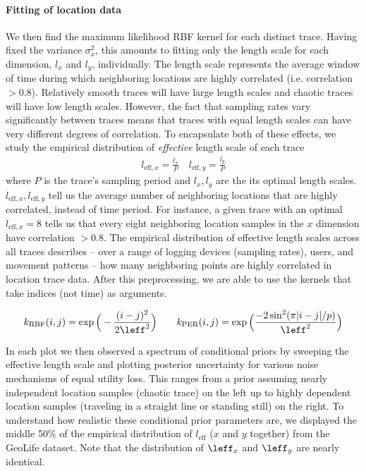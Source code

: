 \paragraph{Fitting of location data} We then find the maximum likelihood RBF kernel for each distinct trace. Having fixed the variance $\sigma_x^2$, this amounts to fitting only the length scale for each dimension, $l_x$ and $l_y$, individually. The length scale represents the average window of time during which neighboring locations are highly correlated (i.e. correlation $ > 0.8$). Relatively smooth traces will have large length scales and chaotic traces will have low length scales. However, the fact that sampling rates vary significantly between traces means that traces with equal length scales can have very different degrees of correlation. To encapsulate both of these effects, we study the empirical distribution of \emph{effective} length scale of each trace
\begin{align*}
	l_{\text{eff},x} = \frac{l_x}{P}
	\quad
	l_{\text{eff},y} = \frac{l_y}{P}
\end{align*}
where $P$ is the trace's sampling period and $l_x,l_y$ are the its optimal length scales. $l_{\text{eff},x},l_{\text{eff},y}$ tell us the average number of neighboring locations that are highly correlated, instead of time period. For instance, a given trace with an optimal $l_{\text{eff},x} = 8$ tells us that every eight neighboring location samples in the $x$ dimension have correlation $> 0.8$. The empirical distribution of effective length scales across all traces describes -- over a range of logging devices (sampling rates), users, and movement patterns -- how many neighboring points are highly correlated in location trace data. After this preprocessing, we are able to use the kernels that take indices (not time) as arguments. 

\begin{align*}
	\label{eqn: kernels}
	k_{\text{RBF}}(i, j) 
	=  \exp \Big( -\frac{(i - j)^2}{2\leff^2} \Big) 
	\quad \quad 
	k_{\text{PER}}(i, j) 
	=  \exp \Big(  \frac{-2 \sin^2(\pi |i - j| / p)}{\leff^2} \Big)
\end{align*}

In each plot we then observed a spectrum of conditional priors by sweeping the effective length scale and plotting posterior uncertainty for various noise mechanisms of equal utility loss. This ranges from a prior assuming nearly independent location samples (chaotic trace) on the left up to highly dependent location samples (traveling in a straight line or standing still) on the right. To understand how realistic these conditional prior parameters are, we displayed the middle 50\% of the empirical distribution of $l_{\text{eff}}$ ($x$ and $y$ together) from the GeoLife dataset. Note that the distribution of ${\leff}_x$ and ${\leff}_y$ are nearly identical. 

